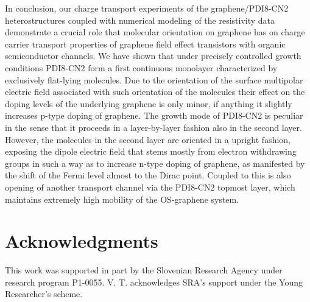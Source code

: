 \documentclass[preprint,aip,jap]{revtex4-2}
\begin{document}
In conclusion, our charge transport experiments of the graphene/PDI8-CN2 heterostructures coupled with numerical modeling of the resistivity data demonstrate a crucial role that molecular orientation on graphene has on charge carrier transport properties of graphene field effect transistors with organic semiconductor channels.
  We have shown that under precisely controlled growth conditions PDI8-CN2 form a first continuous monolayer characterized by exclusively flat-lying molecules.
  Due to the orientation of the surface multipolar electric field associated with such orientation of the molecules their effect on the doping levels  of  the underlying graphene is only minor, if anything it slightly increases p-type doping of graphene.
 The growth mode of PDI8-CN2 is peculiar in the sense that it proceeds in a layer-by-layer fashion also in the second layer.
 However, the molecules in the second layer are oriented in a upright fashion, exposing the dipole electric field that stems mostly from electron withdrawing groups in such a way as to increase n-type doping of graphene, as manifested by the shift of the Fermi  level almost to the Dirac point.
  Coupled to this is also opening of another transport channel via the PDI8-CN2 topmost layer, which maintains extremely high mobility of the OS-graphene system.


\section*{Acknowledgments}


This work was supported in part by the Slovenian Research Agency under research program P1-0055.
  V. T.  acknowledges SRA's support under the Young Researcher's scheme.
   



\end{document}
